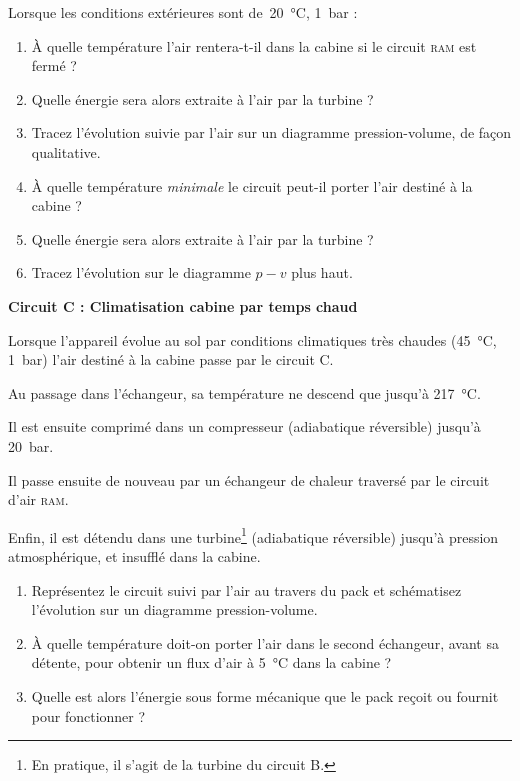 	Lorsque les conditions extérieures sont de~\SI{20}{\degreeCelsius}, \SI{1}{\bar} :
	
	\begin{enumerate}
		\item À quelle température l’air rentera-t-il dans la cabine si le circuit \textsc{ram} est fermé ?
		\item Quelle énergie sera alors extraite à l’air par la turbine ?
		\item Tracez l’évolution suivie par l’air sur un diagramme pression-volume, de façon qualitative.
		\item À quelle température \emph{minimale} le circuit peut-il porter l’air destiné à la cabine ?
		\item Quelle énergie sera alors extraite à l’air par la turbine ?
		\item Tracez l’évolution sur le diagramme $p-v$ plus haut.
	\end{enumerate}

\onlyframabook{\clearpage}
\textbf{Circuit C : Climatisation cabine par temps chaud}

	Lorsque l’appareil évolue au sol par conditions climatiques très chaudes (\SI{45}{\degreeCelsius}, \SI{1}{\bar}) l’air destiné à la cabine passe par le circuit C.
	
	Au passage dans l’échangeur, sa température ne descend que jusqu’à \SI{217}{\degreeCelsius}. 
	
	Il est ensuite comprimé dans un compresseur (adiabatique réversible) jusqu’à \SI{20}{\bar}. 
	
	Il passe ensuite de nouveau par un échangeur de chaleur traversé par le circuit d’air \textsc{ram}.
	
	Enfin, il est détendu dans une turbine\footnote{En pratique, il s’agit de la turbine du circuit B.} (adiabatique réversible) jusqu’à pression atmosphérique, et insufflé dans la cabine.
		
	\begin{enumerate}
		\item Représentez le circuit suivi par l’air au travers du pack et schématisez l’évolution sur un diagramme pression-volume.
		\item À quelle température doit-on porter l’air dans le second échangeur, avant sa détente, pour obtenir un flux d’air à \SI{5}{\degreeCelsius} dans la cabine ?
		\item Quelle est alors l’énergie sous forme mécanique que le pack reçoit ou fournit pour fonctionner ?
	\end{enumerate}

